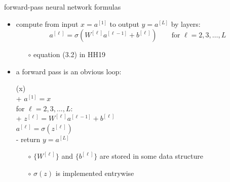 \documentclass[xcolor={svgnames},
               hyperref={colorlinks,citecolor=DeepPink4,linkcolor=FireBrick,urlcolor=Maroon}]
               {beamer}
\begin{document}
\begin{frame}{forward-pass neural network formulas}

\begin{itemize}
\item compute from input $x = a^{[1]}$ to output $y = a^{[L]}$ by layers:
    $$a^{[\ell]} = \sigma\left(W^{[\ell]} a^{[\ell-1]} + b^{[\ell]}\right) \qquad \text{for } \ell=2,3,\dots,L$$

    \begin{itemize}
    \item[$\circ$] equation (3.2) in HH19
    \end{itemize}
\item a forward pass is an obvious loop:

\begin{pseudo*}
(x)\text{:} \\+
    $a^{[1]} = x$ \\
    for $\ell = 2,3,\dots,L$: \\+
        $z^{[\ell]} = W^{[\ell]} a^{[\ell-1]} + b^{[\ell]}$ \\
        $a^{[\ell]} = \sigma\left(z^{[\ell]}\right)$ \\-
    return $y=a^{[L]}$
\end{pseudo*}

    \begin{itemize}
    \item[$\circ$] $\{W^{[\ell]}\}$ and $\{b^{[\ell]}\}$ are stored in some data structure
    \item[$\circ$] $\sigma(z)$ is implemented entrywise
    \end{itemize}
\end{itemize}
\end{frame}
\end{document}
